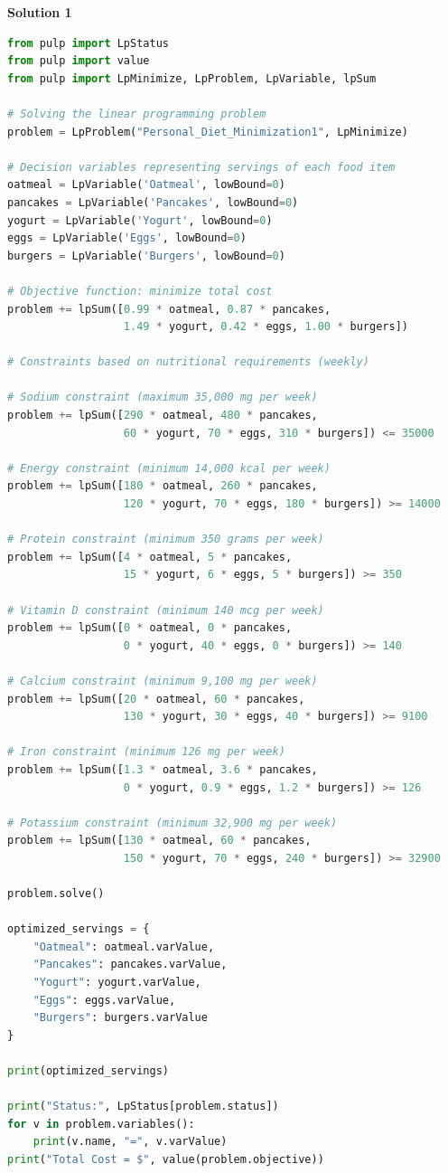 \documentclass{article}
\begin{document}
\label{Code Snippet - Solution1}
\textbf{Solution 1}
\begin{lstlisting}[language=Python]
from pulp import LpStatus
from pulp import value
from pulp import LpMinimize, LpProblem, LpVariable, lpSum

# Solving the linear programming problem
problem = LpProblem("Personal_Diet_Minimization1", LpMinimize)

# Decision variables representing servings of each food item
oatmeal = LpVariable('Oatmeal', lowBound=0)
pancakes = LpVariable('Pancakes', lowBound=0)
yogurt = LpVariable('Yogurt', lowBound=0)
eggs = LpVariable('Eggs', lowBound=0)
burgers = LpVariable('Burgers', lowBound=0)

# Objective function: minimize total cost
problem += lpSum([0.99 * oatmeal, 0.87 * pancakes, 
                  1.49 * yogurt, 0.42 * eggs, 1.00 * burgers])

# Constraints based on nutritional requirements (weekly)

# Sodium constraint (maximum 35,000 mg per week)
problem += lpSum([290 * oatmeal, 480 * pancakes, 
                  60 * yogurt, 70 * eggs, 310 * burgers]) <= 35000

# Energy constraint (minimum 14,000 kcal per week)
problem += lpSum([180 * oatmeal, 260 * pancakes, 
                  120 * yogurt, 70 * eggs, 180 * burgers]) >= 14000

# Protein constraint (minimum 350 grams per week)
problem += lpSum([4 * oatmeal, 5 * pancakes, 
                  15 * yogurt, 6 * eggs, 5 * burgers]) >= 350

# Vitamin D constraint (minimum 140 mcg per week)
problem += lpSum([0 * oatmeal, 0 * pancakes, 
                  0 * yogurt, 40 * eggs, 0 * burgers]) >= 140

# Calcium constraint (minimum 9,100 mg per week)
problem += lpSum([20 * oatmeal, 60 * pancakes, 
                  130 * yogurt, 30 * eggs, 40 * burgers]) >= 9100

# Iron constraint (minimum 126 mg per week)
problem += lpSum([1.3 * oatmeal, 3.6 * pancakes, 
                  0 * yogurt, 0.9 * eggs, 1.2 * burgers]) >= 126

# Potassium constraint (minimum 32,900 mg per week)
problem += lpSum([130 * oatmeal, 60 * pancakes, 
                  150 * yogurt, 70 * eggs, 240 * burgers]) >= 32900

problem.solve()

optimized_servings = {
    "Oatmeal": oatmeal.varValue,
    "Pancakes": pancakes.varValue,
    "Yogurt": yogurt.varValue,
    "Eggs": eggs.varValue,
    "Burgers": burgers.varValue
}

print(optimized_servings)

print("Status:", LpStatus[problem.status])
for v in problem.variables():
    print(v.name, "=", v.varValue)
print("Total Cost = $", value(problem.objective))
\end{lstlisting}
\end{document}
